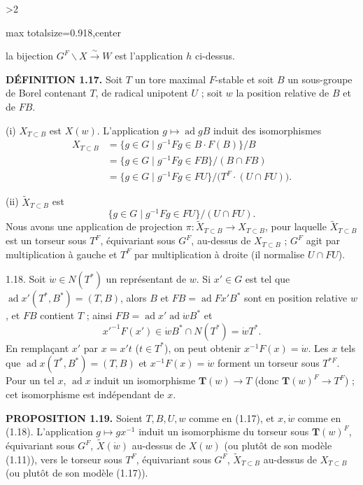 \documentclass[9pt,twoside]{extarticle}
\newcommand{\EditionPage}[3]{%
  \ifnum#1>2\clearpage\fi
  \pdfbookmark[1]{Printed page #2}{fr-folio-#2}%
  \hypertarget{fr-physical-#1}{}%
  \noindent\begin{adjustbox}{max totalsize={\textwidth}{0.918\textheight},center}
  \begin{minipage}[t]{\textwidth}
  \fontsize{9.4}{11.1}\selectfont\justifying
  #3
  \end{minipage}
  \end{adjustbox}%
}
\begin{document}
\EditionPage{13}{114}{%
la bijection \(G^F\backslash X\xrightarrow{\sim}W\) est l'application \(h\) ci-dessus.\par

\noindent\textbf{DÉFINITION 1.17.} Soit \(T\) un tore maximal \(F\)-stable et soit \(B\) un sous-groupe de Borel contenant \(T\), de radical unipotent \(U\) ; soit \(w\) la position relative de \(B\) et de \(FB\).\par

(i) \(X_{T\subset B}\) est \(X(w)\). L'application \(g\mapsto\operatorname{ad}gB\) induit des isomorphismes \[
\begin{aligned}
X_{T\subset B}
&=\{g\in G\mid g^{-1}Fg\in B\cdot F(B)\}/B\\
&=\{g\in G\mid g^{-1}Fg\in FB\}/(B\cap FB)\\
&=\{g\in G\mid g^{-1}Fg\in FU\}/\bigl(T^F\cdot(U\cap FU)\bigr).
\end{aligned}
\]\par

(ii) \(\widetilde X_{T\subset B}\) est \[
\{g\in G\mid g^{-1}Fg\in FU\}/(U\cap FU).
\] Nous avons une application de projection \(\pi:\widetilde X_{T\subset B}\to X_{T\subset B}\), pour laquelle \(\widetilde X_{T\subset B}\) est un torseur sous \(T^F\), équivariant sous \(G^F\), au-dessus de \(X_{T\subset B}\) ; \(G^F\) agit par multiplication à gauche et \(T^F\) par multiplication à droite (il normalise \(U\cap FU\)).\par

1.18. Soit \(\dot w\in N(T^*)\) un représentant de \(w\). Si \(x'\in G\) est tel que \(\operatorname{ad}x'(T^*,B^*)=(T,B)\), alors \(B\) et \(FB=\operatorname{ad}Fx'B^*\) sont en position relative \(w\), et \(FB\) contient \(T\) ; ainsi \(FB=\operatorname{ad}x'\operatorname{ad}\dot wB^*\) et \[
x'^{-1}F(x')\in\dot wB^*\cap N(T^*)=\dot wT^*.
\] En remplaçant \(x'\) par \(x=x't\) (\(t\in T^*\)), on peut obtenir \(x^{-1}F(x)=\dot w\). Les \(x\) tels que \(\operatorname{ad}x(T^*,B^*)=(T,B)\) et \(x^{-1}F(x)=\dot w\) forment un torseur sous \(T^{*F}\). Pour un tel \(x\), \(\operatorname{ad}x\) induit un isomorphisme \(\mathbf T(w)\to T\) (donc \(\mathbf T(w)^F\to T^F\)) ; cet isomorphisme est indépendant de \(x\).\par

\noindent\textbf{PROPOSITION 1.19.} Soient \(T,B,U,w\) comme en (1.17), et \(x,\dot w\) comme en (1.18). L'application \(g\mapsto gx^{-1}\) induit un isomorphisme du torseur sous \(\mathbf T(w)^F\), équivariant sous \(G^F\), \(\widetilde X(\dot w)\) au-dessus de \(X(w)\) (ou plutôt de son modèle (1.11)), vers le torseur sous \(T^F\), équivariant sous \(G^F\), \(\widetilde X_{T\subset B}\) au-dessus de \(X_{T\subset B}\) (ou plutôt de son modèle (1.17)).\par

}
\end{document}
